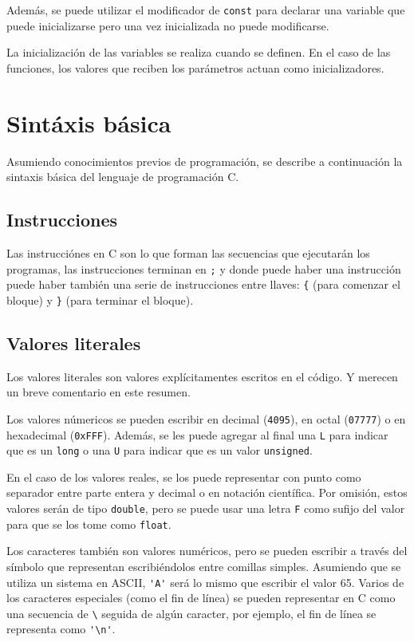 Además, se puede utilizar el modificador de \lstinline!const! para declarar
una variable que puede inicializarse pero una vez inicializada no puede
modificarse.

La inicialización de las variables se realiza cuando se definen. En el caso
de las funciones, los valores que reciben los parámetros actuan como
inicializadores.

\section{Sintáxis básica}

Asumiendo conocimientos previos de programación, se describe a continuación la
sintaxis básica del lenguaje de programación C.

\subsection{Instrucciones}

Las instrucciónes en C son lo que forman las secuencias que ejecutarán los
programas, las instrucciones terminan en \lstinline!;! y donde puede haber una
instrucción puede haber también una serie de instrucciones entre llaves:
\lstinline!{! (para comenzar el bloque) y \lstinline!}! (para terminar el
bloque).

\subsection{Valores literales}

Los valores literales son valores explícitamentes escritos en el código.
Y merecen un breve comentario en este resumen.

Los valores númericos se pueden escribir en decimal (\lstinline!4095!), en
octal (\lstinline!07777!) o en hexadecimal (\lstinline!0xFFF!). Además, se les
puede agregar al final una \lstinline!L! para indicar que es un
\lstinline!long! o una \lstinline!U! para indicar que es un valor
\lstinline!unsigned!.

En el caso de los valores reales, se los puede representar con punto como
separador entre parte entera y decimal o en notación científica. Por omisión,
estos valores serán de tipo \lstinline!double!, pero se puede usar una letra
\lstinline!F! como sufijo del valor para que se los tome como
\lstinline!float!.

Los caracteres también son valores numéricos, pero se pueden escribir a través
del símbolo que representan escribiéndolos entre comillas simples. Asumiendo
que se utiliza un sistema en ASCII, \lstinline!'A'! será lo mismo que escribir
el valor 65.  Varios de los caracteres especiales (como el fin de línea) se
pueden representar en C como una secuencia de \lstinline!\!  seguida de algún
caracter, por ejemplo, el fin de línea se representa como \lstinline!'\n'!.

